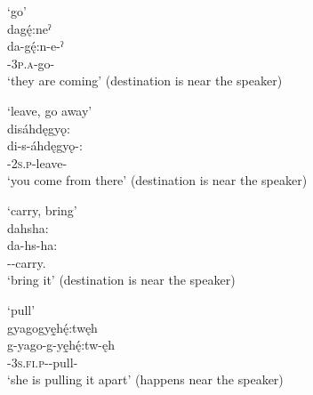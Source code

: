 \newpage
\ea\label{ex:dhex5}  ‘go’\\
dagę́:neˀ\\
\gll da-gę́:n-e-ˀ\\
{\cislocative}-\textsc{3p.a}-go-{\stative}\\
\glt `they are coming' (destination is near the speaker)
\z


\ea\label{ex:dhex6}  ‘leave, go away’\\
disáhdęgyǫ:\\
\gll di-s-áhdęgyǫ-:\\
{\cislocative}-\textsc{2s.p}-leave-{\stative}\\
\glt `you come from there' (destination is near the speaker)
\z


\ea\label{ex:dhex7}  ‘carry, bring’\\
dahsha:\\
\gll da-hs-ha:\\
{\cislocative}--carry.{\noaspect} \\
\glt `bring it' (destination is near the speaker)
\z


\ea\label{ex:dhex8}  ‘pull’\\
gyagogyę̱hę́:twęh\\
\gll g-yago-g-yę̱hę́:tw-ęh\\
{\cislocative}-\textsc{3s.fi.p}-{\semireflexive}-pull-{\stative}\\
\glt `she is pulling it apart' (happens near the speaker)
\z

